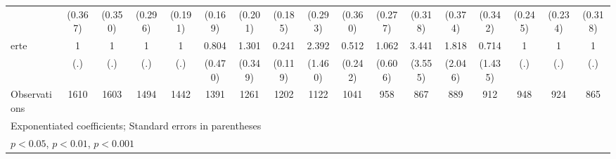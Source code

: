 {\begin{tabular}{l*{16}{c}}
                    &     (0.367)         &     (0.350)         &     (0.296)         &     (0.191)         &     (0.169)         &     (0.201)         &     (0.185)         &     (0.293)         &     (0.360)         &     (0.277)         &     (0.318)         &     (0.374)         &     (0.342)         &     (0.245)         &     (0.234)         &     (0.318)         \\
[1em]
erte                &           1         &           1         &           1         &           1         &       0.804         &       1.301         &       0.241\sym{**} &       2.392         &       0.512         &       1.062         &       3.441         &       1.818         &       0.714         &           1         &           1         &           1         \\
                    &         (.)         &         (.)         &         (.)         &         (.)         &     (0.470)         &     (0.349)         &     (0.119)         &     (1.460)         &     (0.242)         &     (0.606)         &     (3.555)         &     (2.046)         &     (1.435)         &         (.)         &         (.)         &         (.)         \\
\hline
Observations        &        1610         &        1603         &        1494         &        1442         &        1391         &        1261         &        1202         &        1122         &        1041         &         958         &         867         &         889         &         912         &         948         &         924         &         865         \\
\hline\hline
\multicolumn{17}{l}{\footnotesize Exponentiated coefficients; Standard errors in parentheses}\\
\multicolumn{17}{l}{\footnotesize \sym{*} \(p<0.05\), \sym{**} \(p<0.01\), \sym{***} \(p<0.001\)}\\
\end{tabular}
}
